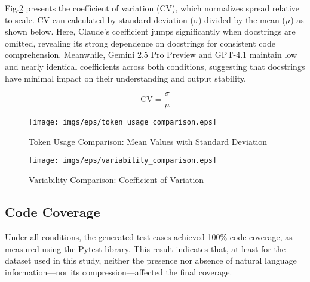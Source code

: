 Fig.\ref{fig:variablity_comparison} presents the coefficient of variation (CV), which normalizes spread relative to scale. CV can calculated by standard deviation ($\sigma$) divided by the mean ($\mu$) as shown below. Here, Claude’s coefficient jumps significantly when docstrings are omitted, revealing its strong dependence on docstrings for consistent code comprehension. Meanwhile, Gemini 2.5 Pro Preview and GPT-4.1 maintain low and nearly identical coefficients across both conditions, suggesting that docstrings have minimal impact on their understanding and output stability.

\[
\mathrm{CV} = \frac{\sigma}{\mu}
\]



\begin{figure}[htbp]
    \centering
    \texttt{[image: imgs/eps/token\_usage\_comparison.eps]}
    \caption{Token Usage Comparison: Mean Values with Standard Deviation}
    \label{fig:token_usage_comparison}
\end{figure}



\begin{figure}[htbp]
    \centering
    \texttt{[image: imgs/eps/variability\_comparison.eps]}
    \caption{Variability Comparison: Coefficient of Variation}
    \label{fig:variablity_comparison}
\end{figure}



\subsection{Code Coverage}
Under all conditions, the generated test cases achieved 100\% code coverage, as measured using the Pytest library. This result indicates that, at least for the dataset used in this study, neither the presence nor absence of natural language information—nor its compression—affected the final coverage.
